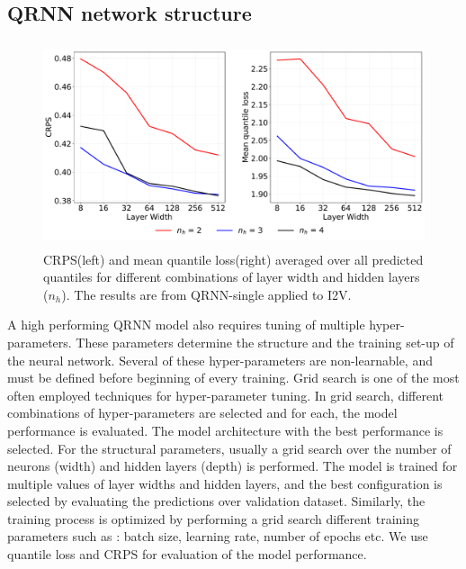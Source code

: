 \documentclass[amt, manuscript]{copernicus}
\begin{document}
\subsection{QRNN network structure}
\label{appendix:hyperparamter}
%
\begin{figure}[t]
	\centering
	\includegraphics[height=60mm]{Figures/CRPS.pdf} 
	\caption{CRPS(left) and mean quantile loss(right) averaged over all predicted quantiles for different combinations of layer width and hidden layers ($n_h$). The results are from QRNN-single applied to I2V.}
	\label{fig:grid_search}	
\end{figure}
A high performing QRNN model also requires tuning of multiple hyper-parameters. These parameters determine the structure and the training set-up of the neural network. Several of these hyper-parameters are non-learnable, and must be defined before beginning of every training. Grid search is one of the most often employed techniques for hyper-parameter tuning. In grid search, different combinations of hyper-parameters are selected and for each, the model performance is evaluated. The model architecture with the best performance is selected. For the structural parameters, usually a grid search over the number of neurons (width) and hidden layers (depth) is performed. The model is trained for multiple values of layer widths and hidden layers, and the best configuration is selected by evaluating the predictions over validation dataset. Similarly, the training process is optimized by performing a grid search different training parameters such as : batch size, learning rate, number of epochs etc. We use quantile loss and CRPS for evaluation of the model performance.
\end{document}
